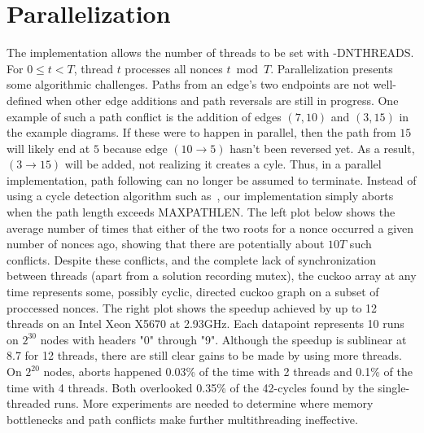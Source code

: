 \documentclass[11pt, oneside]{article}
\begin{document}
\section{Parallelization}
The implementation allows the number of threads to be set with -DNTHREADS.
For $0\leq t < T$, thread $t$ processes all nonces $t \bmod T$.
Parallelization presents some algorithmic challenges. Paths from an edge's two endpoints
are not well-defined when other edge additions and path reversals are still in progress.
One example of such a path conflict is the addition of edges
$(7,10)$ and $(3,15)$ in the example diagrams. If these were to happen in parallel,
then the path from $15$ will likely end at $5$ because
edge $(10 \rightarrow 5)$ hasn't been reversed yet.
As a result, $(3 \rightarrow 15)$ will be added, not realizing it creates a cyle.
Thus, in a parallel implementation, path following can no longer be assumed to terminate.
Instead of using a cycle detection algorithm such as~\cite{1980-brent-cycles}, our implementation
simply aborts when the path length exceeds MAXPATHLEN.
The left plot below shows the average number of times that either of the two roots
for a nonce occurred a given number of nonces ago, showing that there are potentially
about $10T$ such conflicts.
Despite these conflicts, and the complete lack of synchronization between threads
(apart from a solution recording mutex),
the cuckoo array at any time represents some, possibly cyclic, directed cuckoo graph
on a subset of proccessed nonces.
The right plot shows the speedup achieved by up to 12 threads on an Intel Xeon X5670 at 2.93GHz.
Each datapoint represents 10 runs on $2^{30}$ nodes with headers "0" through "9".
Although the speedup is sublinear at 8.7 for 12 threads, there are still clear gains to be made
by using more threads.
On $2^{20}$ nodes, aborts happened 0.03\% of the time with 2 threads and 0.1\% of the time with 4 threads.
Both overlooked 0.35\% of the 42-cycles found by the single-threaded runs.
More experiments are needed to determine where memory bottlenecks
and path conflicts make further multithreading ineffective.
\end{document}
